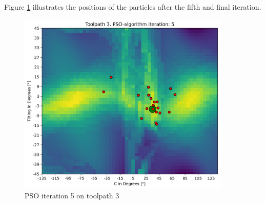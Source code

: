 Figure \ref{5_true} illustrates the positions of the particles after the fifth and final iteration.

\begin{figure}[H]
	\centerline{\includegraphics[width=0.9\textwidth]{figures/swarm_true/3_5.png}}
	\caption{PSO iteration 5 on toolpath 3}
	\label{5_true}
\end{figure}

